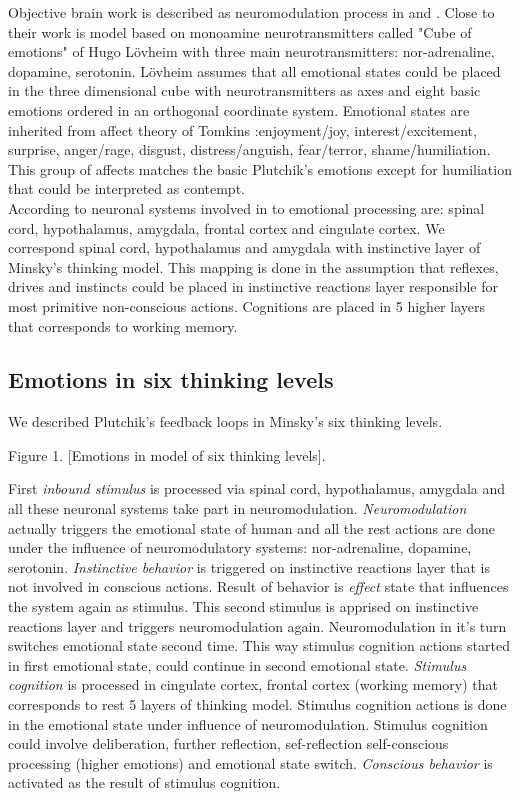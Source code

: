 Objective brain work is described as neuromodulation process in \cite{neuromodulatory} and \cite{emotionsbraintorobot}.
Close to their work is model based on monoamine neurotransmitters called "Cube of emotions" of Hugo L\"{o}vheim\cite{cubeofemotions} with three main neurotransmitters: nor-adrenaline, dopamine, serotonin. L\"{o}vheim assumes that all emotional states could be placed in the three dimensional cube with neurotransmitters as axes and eight basic emotions ordered in an orthogonal coordinate system. Emotional states are inherited from affect theory of Tomkins \cite{tomkins1, tomkins2, tomkins3}:enjoyment/joy, interest/excitement, surprise, anger/rage, disgust, distress/anguish, fear/terror, shame/humiliation. This group of affects matches the basic Plutchik's emotions except for humiliation that could be interpreted as contempt.\\
According to \cite{emotionsbraintorobot} neuronal systems involved in to emotional processing are: spinal cord, hypothalamus, amygdala, frontal cortex and cingulate cortex. We correspond spinal cord, hypothalamus and amygdala with instinctive layer of Minsky's thinking model. This mapping is done in the assumption that reflexes, drives and instincts could be placed in instinctive reactions layer responsible for most primitive non-conscious actions. Cognitions are placed in 5 higher layers that corresponds to working memory.

\subsection{Emotions in six thinking levels}

We described Plutchik's feedback loops\cite{natureofemotions} in Minsky's six thinking levels.

Figure 1. [Emotions in model of six thinking levels].

First \emph{inbound stimulus} is processed via spinal cord, hypothalamus, amygdala and all these neuronal systems take part in neuromodulation. 
\emph{Neuromodulation} actually triggers the emotional state of human and all the rest actions are done under the influence of neuromodulatory systems: nor-adrenaline, dopamine, serotonin. 
\emph{Instinctive behavior} is triggered on instinctive reactions layer that is not involved in conscious actions. 
Result of behavior is \emph{effect} state that influences the system again as stimulus. This second stimulus is apprised on instinctive reactions layer and triggers neuromodulation again. Neuromodulation in it's turn switches emotional state second time. This way stimulus cognition actions started in first emotional state, could continue in second emotional state. 
\emph{Stimulus cognition} is processed in cingulate cortex, frontal cortex (working memory) that corresponds to rest 5 layers of thinking model. Stimulus cognition actions is done in the emotional state under influence of neuromodulation. Stimulus cognition could involve deliberation, further reflection, sef-reflection self-conscious processing (higher emotions) and  emotional state switch.
\emph{Conscious behavior} is activated as the result of stimulus cognition.

